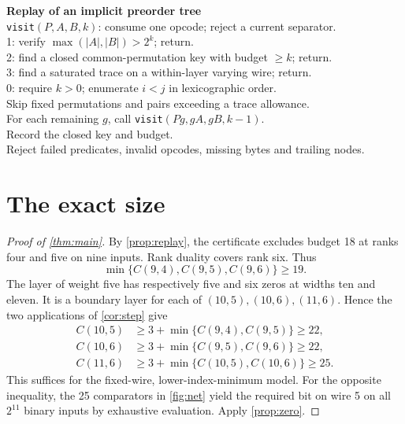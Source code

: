 \begin{center}
\begin{minipage}{0.96\linewidth}\small
\textbf{Replay of an implicit preorder tree}\\[2pt]
\texttt{visit}$(P,A,B,k)$: consume one opcode; reject a current separator.\\
\hspace*{1em}1: verify $\max(|A|,|B|)>2^k$; return.\\
\hspace*{1em}2: find a closed common-permutation key with budget $\ge k$; return.\\
\hspace*{1em}3: find a saturated trace on a within-layer varying wire; return.\\
\hspace*{1em}0: require $k>0$; enumerate $i<j$ in lexicographic order.\\
\hspace*{2em}Skip fixed permutations and pairs exceeding a trace allowance.\\
\hspace*{2em}For each remaining $g$, call \texttt{visit}$(Pg,gA,gB,k-1)$.\\
\hspace*{2em}Record the closed key and budget.\\
Reject failed predicates, invalid opcodes, missing bytes and trailing nodes.
\end{minipage}
\end{center}

\section{The exact size}
\begin{proof}[Proof of \cref{thm:main}]
By \cref{prop:replay}, the certificate excludes budget 18 at ranks four
and five on nine inputs. Rank duality covers rank six. Thus
\[
  \min\{C(9,4),C(9,5),C(9,6)\}\ge 19.
\]
The layer of weight five has respectively five and six zeros at widths ten
and eleven. It is a boundary layer for each of $(10,5),(10,6),(11,6)$.
Hence the two applications of \cref{cor:step} give
\[
\begin{aligned}
 C(10,5)&\ge 3+\min\{C(9,4),C(9,5)\}\ge22,\\
 C(10,6)&\ge 3+\min\{C(9,5),C(9,6)\}\ge22,\\
 C(11,6)&\ge 3+\min\{C(10,5),C(10,6)\}\ge25.
\end{aligned}
\] This suffices for the
fixed-wire, lower-index-minimum model. For the opposite inequality, the
25 comparators in \cref{fig:net} yield the required bit on wire 5 on all
$2^{11}$ binary inputs by exhaustive evaluation. Apply \cref{prop:zero}.
\end{proof}
